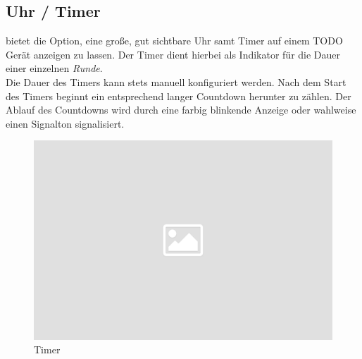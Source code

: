 \subsection{Uhr / Timer}

\noindent
\bb bietet die Option, eine große, gut sichtbare Uhr samt Timer auf einem TODO Gerät anzeigen
zu lassen. Der Timer dient hierbei als Indikator für die Dauer einer einzelnen \textit{Runde}.\\[.1cm]

\noindent
Die Dauer des Timers kann stets manuell konfiguriert werden. Nach dem Start des Timers beginnt
ein entsprechend langer Countdown herunter zu zählen. Der Ablauf des Countdowns wird durch eine
farbig blinkende Anzeige oder wahlweise einen Signalton signalisiert.\\[.1cm]

\noindent
\begin{figure}[ht]
	\centering
  \includegraphics[width=16cm]{pictures/placeholder.png}
	\caption{Timer}
	\label{pic/timer}
\end{figure}

